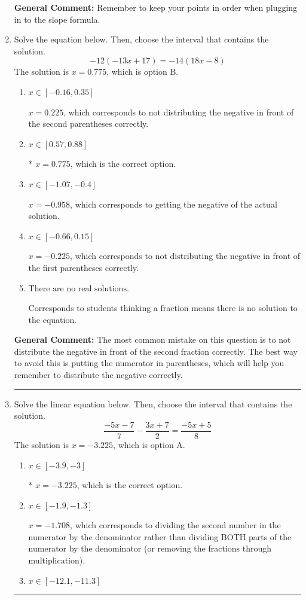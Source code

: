 \documentclass{extbook}[14pt]
\newcommand{\litem}[1]{\item #1

\rule{\textwidth}{0.4pt}}
\begin{document}
\begin{enumerate}
{\textbf{General Comment:} Remember to keep your points in order when plugging in to the slope formula.
}
\litem{
Solve the equation below. Then, choose the interval that contains the solution.
\[ -12(-13x + 17) = -14(18x -8) \]
The solution is \( x = 0.775 \), which is option B.\begin{enumerate}[label=\Alph*.]
\item \( x \in [-0.16, 0.35] \)

$x = 0.225$, which corresponds to not distributing the negative in front of the second parentheses correctly.
\item \( x \in [0.57, 0.88] \)

* $x = 0.775$, which is the correct option.
\item \( x \in [-1.07, -0.4] \)

$x = -0.958$, which corresponds to getting the negative of the actual solution.
\item \( x \in [-0.66, 0.15] \)

$x = -0.225$, which corresponds to not distributing the negative in front of the first parentheses correctly.
\item \( \text{There are no real solutions.} \)

Corresponds to students thinking a fraction means there is no solution to the equation.
\end{enumerate}

\textbf{General Comment:} The most common mistake on this question is to not distribute the negative in front of the second fraction correctly. The best way to avoid this is putting the numerator in parentheses, which will help you remember to distribute the negative correctly.
}
\litem{
Solve the linear equation below. Then, choose the interval that contains the solution.
\[ \frac{-5x -7}{7} - \frac{3x + 7}{2} = \frac{-5x + 5}{8} \]
The solution is \( x = -3.225 \), which is option A.\begin{enumerate}[label=\Alph*.]
\item \( x \in [-3.9, -3] \)

* $x = -3.225$, which is the correct option.
\item \( x \in [-1.9, -1.3] \)

 $x = -1.708$, which corresponds to dividing the second number in the numerator by the denominator rather than dividing BOTH parts of the numerator by the denominator (or removing the fractions through multiplication).
\item \( x \in [-12.1, -11.3] \)


\end{enumerate}}
\end{enumerate}
\end{document}
